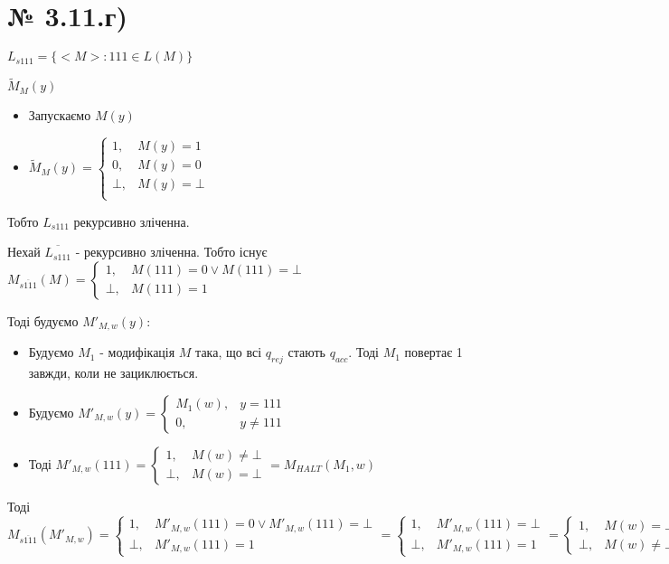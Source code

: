 \documentclass[11pt, a4paper]{article} %
\begin{document}
\section*{№ 3.11.г)}
\begin{mdframed}
    $L_{s111} = \{<M> : 111 \in L(M)\}$
\end{mdframed}

$\tilde{M}_M(y)$
\begin{itemize}
    \item Запускаємо $M(y)$
    \item $\tilde{M}_M(y) = \begin{cases}
        1, & M(y) = 1\\
        0, & M(y) = 0\\
        \bot, & M(y) = \bot\\
    \end{cases}$
\end{itemize}

Тобто $L_{s111}$ рекурсивно зліченна.

Нехай $\overline{L_{s111}}$ - рекурсивно зліченна.
Тобто існує $M_{\overline{s111}}(M) = \begin{cases}
    1, & M(111) = 0 \vee M(111) = \bot\\
    \bot, & M(111) = 1
\end{cases}$

Тоді будуємо $M'_{M,w}(y)$:
\begin{itemize}
    \item Будуємо $M_1$ - модифікація $M$ така, що всі $q_{rej}$ стають $q_{acc}$.
    Тоді $M_1$ повертає 1 завжди, коли не зациклюється.

    \item Будуємо $M'_{M,w}(y) = \begin{cases}
        M_1(w), & y = 111\\
        0, & y \ne 111
    \end{cases}$

    \item Тоді $M'_{M,w}(111) = \begin{cases}
        1, & M(w) \ne \bot\\
        \bot, & M(w) = \bot
    \end{cases} = M_{HALT}(M_1, w)$
\end{itemize}

Тоді $$M_{\overline{s111}}(M'_{M,w}) = \begin{cases}
    1, &  M'_{M,w}(111) = 0 \vee M'_{M,w}(111) = \bot\\
    \bot, & M'_{M,w}(111) = 1
\end{cases} = \begin{cases}
    1, & M'_{M,w}(111) = \bot \\
    \bot, & M'_{M,w}(111) = 1
\end{cases} = \begin{cases}
    1, & M(w) = \bot \\
    \bot, & M(w) \ne \bot
\end{cases} \simeq M_{\overline{HALT}}(M, w)$$
\end{document}
